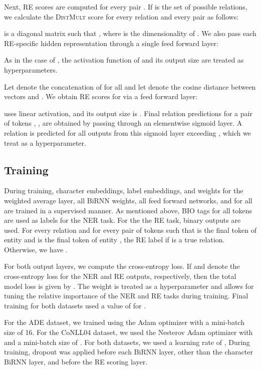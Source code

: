 \documentclass{article}
\begin{document}
Next, RE scores are computed for every pair . If  is the set of possible relations, we calculate the \textsc{DistMult} score \cite{yang2014embedding} for every relation  and every pair  as follows: 

 is a diagonal matrix such that , where  is the dimensionality of . We also pass each RE-specific hidden representation  through a single feed forward layer: 

As in the case of , the activation function of  and its output size are treated as hyperparameters. 

Let  denote the concatenation of  for all  and let  denote the cosine distance between vectors  and . We obtain RE scores for  via a feed forward layer:

 uses linear activation, and its output size is . Final relation predictions for a pair of tokens , , are obtained by passing  through an elementwise sigmoid layer. A relation is predicted for all outputs from this sigmoid layer exceeding , which we treat as a hyperparameter.

\subsection{Training}

During training, character embeddings, label embeddings, and weights for the weighted average layer, all BiRNN weights, all feed forward networks, and  for all  are trained in a supervised manner. As mentioned above, BIO tags for all tokens are used as labels for the NER task. For the the RE task, binary outputs are used. For every relation  and for every pair of tokens  such that  is the final token of entity  and  is the final token of entity , the RE label  if  is a true relation. Otherwise, we have . 

For both output layers, we compute the cross-entropy loss. If  and  denote the cross-entropy loss for the NER and RE outputs, respectively, then the total model loss is given by . The weight  is treated as a hyperparameter and allows for tuning the relative importance of the NER and RE tasks during training. Final training for both datasets used a value of  for . 

For the ADE dataset, we trained using the Adam optimizer with a mini-batch size of 16. For the CoNLL04 dataset, we used the Nesterov Adam optimizer with and a mini-batch size of . For both datasets, we used a learning rate of , During training, dropout was applied before each BiRNN layer, other than the character BiRNN layer, and before the RE scoring layer. 
\end{document}
